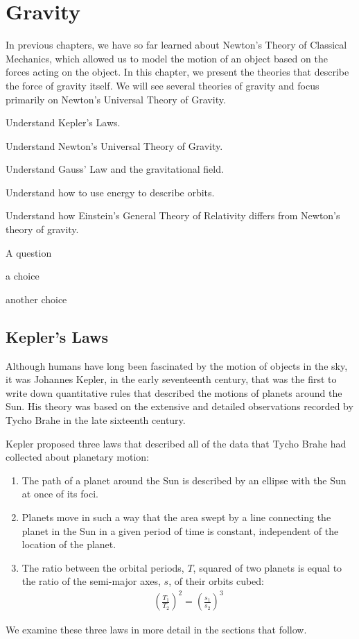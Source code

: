 
\chapter{Gravity}
\label{chapter:gravity}
In previous chapters, we have so far learned about Newton's Theory of Classical Mechanics, which allowed us to model the motion of an object based on the forces acting on the object. In this chapter, we present the theories that describe the force of gravity itself. We will see several theories of gravity and focus primarily on Newton's Universal Theory of Gravity. 

\begin{learningObjectives}{
 \item Understand Kepler's Laws.
 \item Understand Newton's Universal Theory of Gravity. 
 \item Understand Gauss' Law and the gravitational field.
 \item Understand how to use energy to describe orbits.
 \item Understand how Einstein's General Theory of Relativity differs from Newton's theory of gravity.
 }
\end{learningObjectives}

\begin{opening}
\begin{MCquestion}{A question}
\item a choice
\item another choice %
\end{MCquestion}
\end{opening}

\section{Kepler's Laws}
Although humans have long been fascinated by the motion of objects in the sky, it was Johannes Kepler, in the early seventeenth century, that was the first to write down quantitative rules that described the motions of planets around the Sun. His theory was based on the extensive and detailed observations recorded by Tycho Brahe in the late sixteenth century. 

Kepler proposed three laws that described all of the data that Tycho Brahe had collected about planetary motion:
\begin{enumerate}
\item The path of a planet around the Sun is described by an ellipse with the Sun at once of its foci.
\item Planets move in such a way that the area swept by a line connecting the planet in the Sun in a given period of time is constant, independent of the location of the planet.
\item The ratio between the orbital periods, $T$, squared of two planets is equal to the ratio of the semi-major axes, $s$, of their orbits cubed:
\begin{align*}
\left(\frac{T_1}{T_2}\right)^2=\left(\frac{s_1}{s_2}\right)^3
\end{align*}
\end{enumerate}
We examine these three laws in more detail in the sections that follow.

